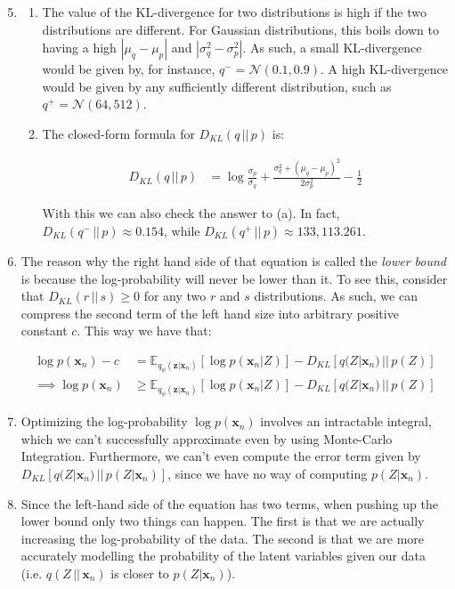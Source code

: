 \documentclass{article}
\begin{document}
\begin{enumerate}[label=\textbf{1.\arabic*}]
  \setcounter{enumi}{4}
  \item

  \begin{enumerate}[label=(\alph*)]
    \item
    The value of the KL-divergence for two distributions is high if the two distributions are different. For Gaussian distributions, this boils down to having a high $|\mu_q - \mu_p|$ and $|\sigma_q^2 - \sigma_p^2|$. As such, a small KL-divergence would be given by, for instance, $q^- = \mathcal{N}(0.1, 0.9)$. A high KL-divergence would be given by any sufficiently different distribution, such as $q^+ = \mathcal{N}(64, 512)$.

    \item
    The closed-form formula for $D_{KL} (q\,||\,p)$ is:

    \begin{align*}
      D_{KL} (q\,||\,p) &= \log \frac{\sigma_p}{\sigma_q} + \frac{\sigma_q^2 + (\mu_q - \mu_p)^2}{2 \sigma_p^2} - \frac{1}{2}
    \end{align*}

    With this we can also check the answer to (a). In fact, $D_{KL} (q^-\,||\,p) \approx 0.154$, while $D_{KL} (q^+\,||\,p) \approx 133,113.261$.
  \end{enumerate}

  \item
  The reason why the right hand side of that equation is called the \textit{lower bound} is because the log-probability will never be lower than it. To see this, consider that $D_{KL}(r\,||\,s) \geq 0$ for any two $r$ and $s$ distributions. As such, we can compress the second term of the left hand size into arbitrary positive constant $c$. This way we have that:

  \begin{align*}
    \log p(\bm{x}_n) - c &= \mathbb{E}_{q_{\phi}(\bm{z}|\bm{x}_n)} \left[ \log p(\bm{x}_n|Z) \right] - D_{KL}\left[q(Z|\bm{x}_n)\,||\,p(Z)\right] \\
    \implies \log p(\bm{x}_n) &\geq \mathbb{E}_{q_{\phi}(\bm{z}|\bm{x}_n)} \left[ \log p(\bm{x}_n|Z) \right] - D_{KL}\left[q(Z|\bm{x}_n)\,||\,p(Z)\right]
  \end{align*}

  \item
  Optimizing the log-probability $\log p(\bm{x}_n)$ involves an intractable integral, which we can't successfully approximate even by using Monte-Carlo Integration. Furthermore, we can't even compute the error term given by $D_{KL}\left[q(Z|\bm{x}_n)\,||\,p(Z|\bm{x}_n)\right]$, since we have no way of computing $p(Z|\bm{x}_n)$.

  \item
  Since the left-hand side of the equation has two terms, when pushing up the lower bound only two things can happen. The first is that we are actually increasing the log-probability of the data. The second is that we are more accurately modelling the probability of the latent variables given our data (i.e. $q(Z\,||\,\bm{x}_n)$ is closer to $p(Z|\bm{x}_n)$).
\end{enumerate}
\end{document}
